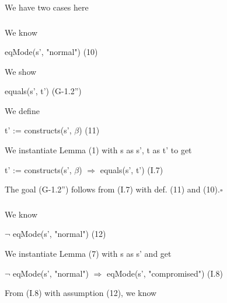 \documentclass[conference]{IEEEtran}
\begin{document}
\noindent We have two cases here

\subsubsection*{} 

\noindent We know

\begin{center}
eqMode(s', "normal")  \hspace*{1cm} (10)
\end{center}
\noindent We show
\begin{center}
equals(s', t')  \hspace*{2cm} (G-1.2'')
\end{center}

\noindent We define

\begin{center}
t' := constructs(s', $\beta$)  \hspace*{0.9cm} (11)
\end{center}

\noindent We instantiate Lemma (1) with
s as s', t as t' to get
\begin{center}
t' := constructs(s', $\beta$) $\Rightarrow$ equals(s', t')  \hspace*{1cm} (I.7)
\end{center}

\noindent The goal (G-1.2'') follows from (I.7) with def. (11) and (10).$\square$

\subsubsection*{}

\noindent We know

\begin{center}
$\neg$ eqMode(s', "normal")  \hspace*{1cm} (12)
\end{center}

\noindent We instantiate Lemma (7) with
s as s' and get

\begin{center}
$\neg$ eqMode(s', "normal") $\Rightarrow$ eqMode(s', "compromised")  \hspace*{0.3cm} (I.8)
\end{center}

\noindent From (I.8) with assumption (12), we know
\end{document}

